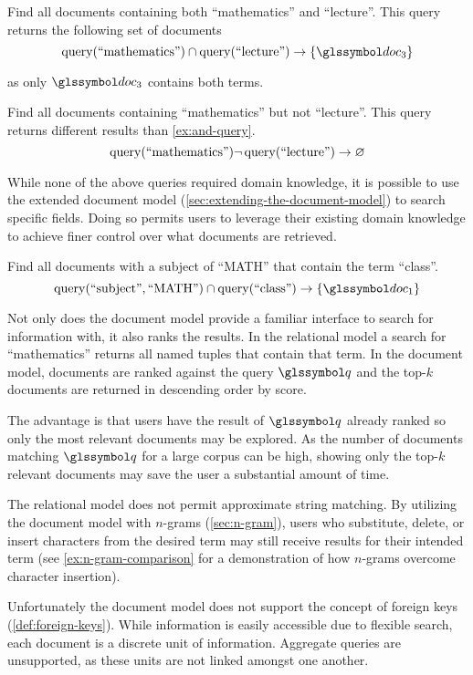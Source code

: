 		\begin{ex}
		\label{ex:and-query}
			Find all documents containing both ``mathematics'' and ``lecture''.  This query returns the following set of documents
			\[
				\query(\text{``mathematics''}) \cap \query(\text{``lecture''}) \rightarrow \{\doc_3\}
			\]
			
			as only \(\doc_3\) contains both terms.
		\end{ex}
		
		\begin{ex}
			Find all documents containing ``mathematics'' but not ``lecture''.  This query returns different results than \cref{ex:and-query}.
			\[
				\operatorname{query}(\text{``mathematics''})\neg\operatorname{query}(\text{``lecture''}) \rightarrow \varnothing
			\]
		\end{ex}
		
		While none of the above queries required domain knowledge, it is possible to use the extended document model (\cref{sec:extending-the-document-model}) to search specific fields.  Doing so permits users to leverage their existing domain knowledge to achieve finer control over what documents are retrieved.
		
		\begin{ex}
		\label{ex:extended-query}
			Find all documents with a subject of ``MATH'' that contain the term ``class''.
			\[
				\query(\text{``subject''}, \text{``MATH''}) \cap \query(\text{``class''}) \rightarrow \{\doc_1\}
			\]
		\end{ex}
		
		Not only does the document model provide a familiar interface to search for information with, it also ranks the results.  In the relational model a search for ``mathematics'' returns all named tuples that contain that term.  In the document model, documents are ranked against the query \(\q\) and the top-\(k\) documents are returned in descending order by score.
		
		The advantage is that users have the result of \(\q\) already ranked so only the most relevant documents may be explored.	 As the number of documents matching \(\q\) for a large corpus can be high, showing only the top-\(k\) relevant documents may save the user a substantial amount of time.
		
		The relational model does not permit approximate string matching.  By utilizing the document model with \(n\)-grams (\cref{sec:n-gram}), users who substitute, delete, or insert characters from the desired term may still receive results for their intended term (see \cref{ex:n-gram-comparison} for a demonstration of how \(n\)-grams overcome character insertion).
		
		Unfortunately the document model does not support the concept of foreign keys (\cref{def:foreign-keys}).  While information is easily accessible due to flexible search, each document is a discrete unit of information.  Aggregate queries are unsupported, as these units are not linked amongst one another.